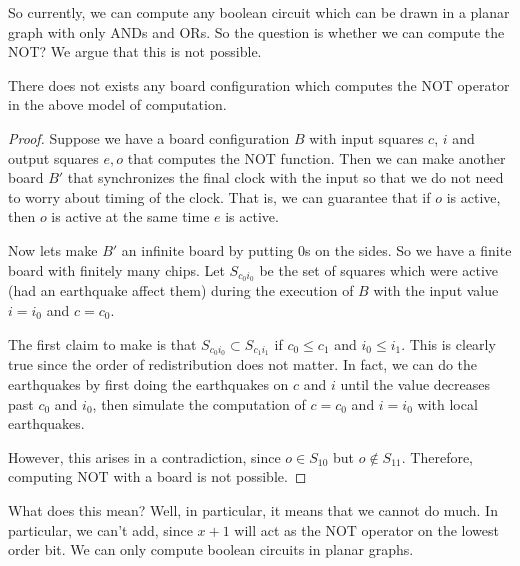 \documentclass[runningheads,a4paper]{llncs}
\begin{document}
So currently, we can compute any boolean circuit which can be drawn in a planar graph with only ANDs and ORs. So the question is whether we can compute the NOT? We argue that this is not possible. 

\begin{theorem}
There does not exists any board configuration which computes the NOT operator in the above model of computation.
\end{theorem}

\begin{proof}
Suppose we have a board configuration $B$ with input squares $c$, $i$ and output squares $e, o$ that computes the NOT function. Then we can make another board $B'$ that synchronizes the final clock with the input so that we do not need to worry about timing of the clock. That is, we can guarantee that if $o$ is active, then $o$ is active at the same time $e$ is active.

Now lets make $B'$ an infinite board by putting 0s on the sides. So we have a finite board with finitely many chips. Let $S_{c_0i_0}$ be the set of squares which were active (had an earthquake affect them) during the execution of $B$ with the input value $i = i_0$ and $c = c_0$. 

The first claim to make is that $S_{c_0i_0} \subset S_{c_1i_1}$ if $c_0 \leq c_1$ and $i_0 \leq i_1$. This is clearly true since the order of redistribution does not matter. In fact, we can do the earthquakes by first doing the earthquakes on $c$ and $i$ until the value decreases past $c_0$ and $i_0$, then simulate the computation of $c = c_0$ and $i = i_0$ with local earthquakes.

However, this arises in a contradiction, since $o \in S_{10}$ but $o \notin S_{11}$. Therefore, computing NOT with a board is not possible.
\end{proof}

What does this mean? Well, in particular, it means that we cannot do much. In particular, we can't add, since $x + 1$ will act as the NOT operator on the lowest order bit. We can only compute boolean circuits in planar graphs. 
\end{document}
